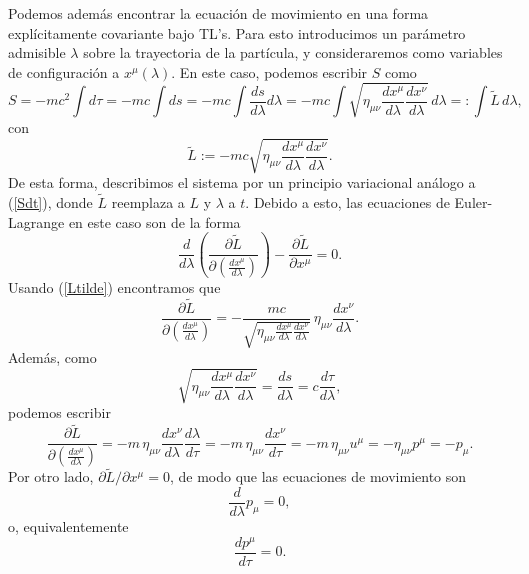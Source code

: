 Podemos además encontrar la ecuación de movimiento en una forma explícitamente
covariante bajo TL's. Para esto introducimos un parámetro admisible $\lambda$
sobre la trayectoria de la partícula, y consideraremos como variables de
configuración a $x^\mu(\lambda)$. En este caso, podemos escribir $S$ como
\begin{equation}
S=-mc^2\int  d\tau=-mc\int  ds=-mc\int  \frac{ds}{d\lambda}d\lambda=-mc\int
\sqrt{\eta_{\mu\nu}\frac{dx^\mu}{d\lambda}\frac{dx^\nu}{d\lambda}}\,
d\lambda=:\int  \tilde{L}\,d\lambda,
\end{equation}
con
\begin{equation}
\tilde{L}:=-mc\sqrt{\eta_{\mu\nu}\frac{dx^\mu}{d\lambda}\frac{dx^\nu}{d\lambda}}
. \label{Ltilde}
\end{equation}
De esta forma, describimos el sistema por un principio variacional análogo a
(\ref{Sdt}), donde $\tilde{L}$ reemplaza a $L$ y $\lambda$ a $t$. Debido a esto,
las ecuaciones de Euler-Lagrange en este caso son de la forma
\begin{equation}
\frac{d}{d\lambda}\left(  \frac{\partial
\tilde{L}}{\partial\left(\frac{dx^\mu}{d\lambda}\right) }\right)-\frac{\partial
\tilde{L}}{\partial x^\mu}=0.
\end{equation}
Usando (\ref{Ltilde}) encontramos que
\begin{equation}
 \frac{\partial \tilde{L}}{\partial\left(\frac{dx^\mu}{d\lambda}\right)
}=-\frac{mc}{\sqrt{\eta_{\mu\nu}\frac{dx^\mu}{d\lambda}\frac{dx^\nu}{d\lambda}}}
\,\eta_{\mu\nu}\frac{dx^\nu}{d\lambda}.
\end{equation}
Además, como
\begin{equation}
\sqrt{\eta_{\mu\nu}\frac{dx^\mu}{d\lambda}\frac{dx^\nu}{d\lambda}}=\frac{ds}{
d\lambda}=c\frac{d\tau}{d\lambda},
\end{equation}
podemos escribir
\begin{equation}
 \frac{\partial \tilde{L}}{\partial\left(\frac{dx^\mu}{d\lambda}\right)
}=-m\,\eta_{\mu\nu}\frac{dx^\nu}{d\lambda}\frac{d\lambda}{d\tau}=-m\,\eta_{
\mu\nu}\frac{dx^\nu}{d\tau}=-m\,\eta_{\mu\nu}u^\mu=-\eta_{\mu\nu}p^\mu=-p_\mu.
\end{equation}
Por otro lado, ${\partial \tilde{L}}/{\partial x^\mu}=0$, de modo que las
ecuaciones de movimiento son
\begin{equation}
\frac{d}{d\lambda}p_\mu=0,
\end{equation}
o, equivalentemente
\begin{equation}
\frac{dp^\mu}{d\tau}  =0.
\end{equation}

